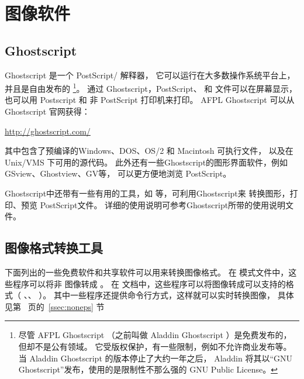 \section{图像软件}\label{sec:graphicsoftware}

\subsection{Ghostscript}\label{ssec:gs}
Ghostscript 是一个 PostScript/ 解释器，
它可以运行在大多数操作系统平台上，并且是自由发布的
\footnote{
	尽管 AFPL Ghostscript （之前叫做 Aladdin Ghostscript ）是免费发布的，
	但却不是公有领域。
	它受版权保护，有一些限制，例如不允许商业发布等。
	当 Aladdin Ghostscript 的版本停止了大约一年之后，
	Aladdin 将其以“GNU Ghostscript”发布，使用的是限制性不那么强的 GNU Public License。}。
通过 Ghostscript，PostScript、 和  文件可以在屏幕显示，
也可以用 Postscript 和 非 PostScript 打印机来打印。
AFPL Ghostscript 可以从 Ghostscript 官网获得：
\begin{center}
	\url{http://ghostscript.com/}
\end{center}
其中包含了预编译的Windows、DOS、OS/2 和 Macintosh 可执行文件，
以及在 Unix/VMS 下可用的源代码。
此外还有一些Ghostscript的图形界面软件，例如GSview、Ghostview、GV等，
可以更方便地浏览 PostScript。

Ghostscript中还带有一些有用的工具，如  等，可利用Ghostscript来
转换图形，打印、预览 PostScript文件。
详细的使用说明可参考Ghostscript所带的使用说明文件。

\subsection{图像格式转换工具}\label{ssec:convertor}

下面列出的一些免费软件和共享软件可以用来转换图像格式。
在  模式文件中，这些程序可以将非 图像转成 。
在 \pdfLaTeX{} 文档中，这些程序可以将图像转成可以支持的格式（ 、、 ）。
其中一些程序还提供命令行方式，这样就可以实时转换图像，
具体见第~\pageref{ssec:noneps} 页的~\ref{ssec:noneps} 节

